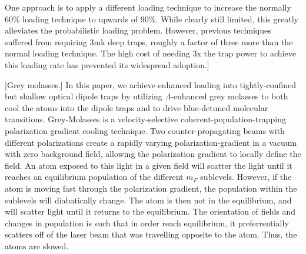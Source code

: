 \documentclass[aps,prl,amsmath,amssymb,groupedaddress,10pt,superscriptaddress,floatfix,twocolumn,showkeys,longbibliography]{revtex4-1} %
\begin{document}
One approach is to apply a different loading technique to increase the normally 60\% loading technique to upwards of 90\%. While clearly still limited, this greatly alleviates the probabilistic loading problem. However, previous techniques suffered from requiring 3mk deep traps, roughly a factor of three more than the normal loading technique. The high cost of needing 3x the trap power to achieve this loading rate has prevented its widespread adoption.]

[Grey molasses.] In this paper, we achieve enhanced loading into tightly-confined but shallow optical dipole traps by utilizing $\Lambda$-enhanced grey molasses to both cool the atoms into the dipole traps and to drive blue-detuned molecular transitions. Grey-Molasses is a velocity-selective coherent-population-trapping polarization gradient cooling technique. Two counter-propagating beams with different polarizations create a rapidly varying polarization-gradient in a vacuum with zero background field, allowing the polarization gradient to locally define the field. An atom exposed to this light in a given field will scatter the light until it reaches an equilibrium population of the different $m_F$ sublevels. However, if the atom is moving fast through the polarization gradient, the population within the sublevels will diabatically change. The atom is then not in the equilibrium, and will scatter light until it returns to the equilibrium. The orientation of fields and changes in population is such that in order reach equilibrium, it preferrentially scatters off of the laser beam that was travelling opposite to the atom. Thus, the atoms are slowed.
\end{document}
